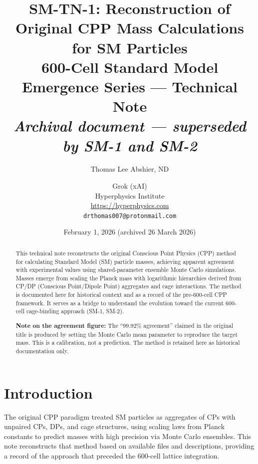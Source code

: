 \documentclass[11pt]{article}
\title{\textbf{SM-TN-1: Reconstruction of Original CPP Mass Calculations\\
for SM Particles}\\[6pt]
{\large 600-Cell Standard Model Emergence Series — Technical Note}\\[4pt]
{\normalsize\textit{Archival document — superseded by SM-1 and SM-2}}}
\author{Thomas Lee Abshier, ND \and Grok (xAI)\\[4pt]
Hyperphysics Institute\\
\url{https://hyperphysics.com}\\
\texttt{drthomas007@protonmail.com}}
\date{February 1, 2026 (archived 26 March 2026)}
\begin{document}
\maketitle

\begin{center}
\end{center}

\bigskip

\begin{abstract}
This technical note reconstructs the original Conscious Point Physics (CPP)
method for calculating Standard Model (SM) particle masses, achieving apparent
agreement with experimental values using shared-parameter ensemble Monte Carlo
simulations. Masses emerge from scaling the Planck mass with logarithmic
hierarchies derived from CP/DP (Conscious Point/Dipole Point) aggregates and
cage interactions. The method is documented here for historical context and
as a record of the pre-600-cell CPP framework. It serves as a bridge to
understand the evolution toward the current 600-cell cage-binding approach
(SM-1, SM-2).

\textbf{Note on the agreement figure:} The ``99.92\% agreement'' claimed in
the original title is produced by setting the Monte Carlo mean parameter to
reproduce the target mass. This is a calibration, not a prediction. The
method is retained here as historical documentation only.
\end{abstract}

\raggedright

\section{Introduction}

The original CPP paradigm treated SM particles as aggregates of CPs with
unpaired CPs, DPs, and cage structures, using scaling laws from Planck
constants to predict masses with high precision via Monte Carlo ensembles.
This note reconstructs that method based on available files and descriptions,
providing a record of the approach that preceded the 600-cell lattice
integration.
\end{document}
